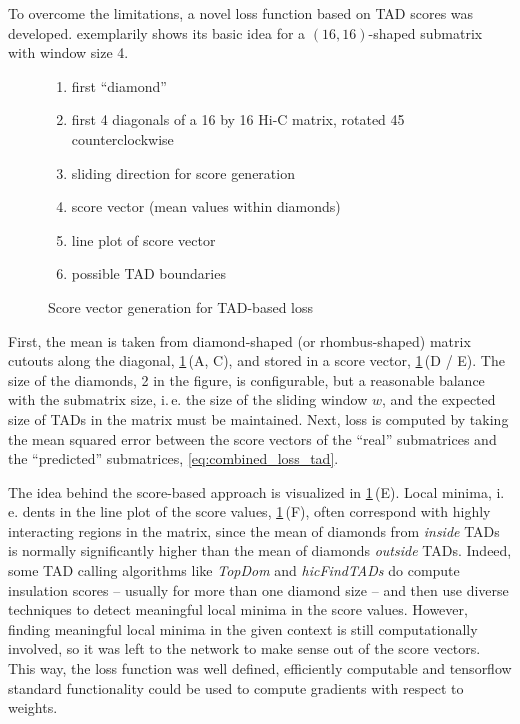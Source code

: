 To overcome the limitations, a novel loss function based on TAD scores \cite{Crane2015} was developed.
 exemplarily shows its basic idea for a $(16,16)$-shaped submatrix
with window size 4.
\begin{figure}[hbt]
 \begin{minipage}{0.65\textwidth}
    \caption{Score vector generation for TAD-based loss}
    \label{fig:improve:tad_score_loss_function}
 \end{minipage}\hfill
 \begin{minipage}{0.3\textwidth}
 \scriptsize
  \begin{enumerate}[label=\Alph*:,leftmargin=*]
   \raggedright
    \item first ``diamond''
    \item first 4 diagonals of a 16 by 16 Hi-C matrix, rotated \SI{45}{\deg} counterclockwise
    \item sliding direction for score generation
    \item score vector (mean values within diamonds)
    \item line plot of score vector
    \item possible TAD boundaries
\end{enumerate}
 \end{minipage}
\end{figure}
First, the mean is taken from diamond-shaped (or rhombus-shaped) matrix cutouts along the diagonal, \cref{fig:improve:tad_score_loss_function}\,(A, C),
and stored in a score vector, \cref{fig:improve:tad_score_loss_function}\,(D / E). 
The size of the diamonds, 2 in the figure, is configurable, but a reasonable balance with the submatrix size, i.\,e. the size of the sliding window $w$,
and the expected size of TADs in the matrix must be maintained.
Next, loss is computed by taking the mean squared error between the score vectors of the ``real'' submatrices and the ``predicted'' submatrices, \cref{eq:combined_loss_tad}.

The idea behind the score-based approach is visualized in \cref{fig:improve:tad_score_loss_function}\,(E).
Local minima, i.\,e. dents in the line plot of the score values, \cref{fig:improve:tad_score_loss_function}\,(F),
often correspond with highly interacting regions in the matrix, since the mean of diamonds from \emph{inside} TADs is normally significantly higher than the mean of diamonds \emph{outside} TADs.
Indeed, some TAD calling algorithms like \emph{TopDom} \cite{Shin2015} and \emph{hicFindTADs} \cite[W12f.]{Wolff2018} do compute insulation scores -- usually for more than one diamond size -- 
and then use diverse techniques to detect meaningful local minima in the score values.
However, finding meaningful local minima in the given context is still computationally involved,
so it was left to the network to make sense out of the score vectors.
This way, the loss function was well defined, efficiently computable and tensorflow standard functionality could be used to compute gradients with respect to weights.

